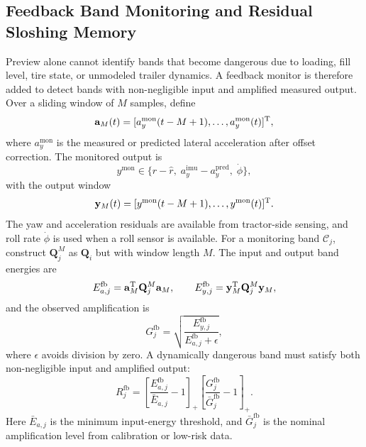 \subsection{Feedback Band Monitoring and Residual Sloshing Memory}
Preview alone cannot identify bands that become dangerous due to loading, fill level, tire state, or unmodeled trailer dynamics. A feedback monitor is therefore added to detect bands with non-negligible input and amplified measured output. Over a sliding window of $M$ samples, define
\begin{equation}
    \mathbf{a}_M(t)=[a_y^{\mathrm{mon}}(t-M+1),\ldots,a_y^{\mathrm{mon}}(t)]^{\mathrm{T}} ,
\end{equation}
where $a_y^{\mathrm{mon}}$ is the measured or predicted lateral acceleration after offset correction. The monitored output is
\begin{equation}
    y^{\mathrm{mon}}\in\{r-\hat r,\; a_y^{\mathrm{imu}}-a_y^{\mathrm{pred}},\; \dot\phi\},
\end{equation}
with the output window
\begin{equation}
    \mathbf{y}_M(t)=[y^{\mathrm{mon}}(t-M+1),\ldots,y^{\mathrm{mon}}(t)]^{\mathrm{T}} .
\end{equation}
The yaw and acceleration residuals are available from tractor-side sensing, and roll rate $\dot\phi$ is used when a roll sensor is available. For a monitoring band $\mathcal{C}_j$, construct $\mathbf{Q}_j^{M}$ as $\mathbf{Q}_i$ but with window length $M$. The input and output band energies are
\begin{equation}
    E_{a,j}^{\mathrm{fb}}=\mathbf{a}_M^{\mathrm{T}}\mathbf{Q}_j^{M}\mathbf{a}_M,\qquad
    E_{y,j}^{\mathrm{fb}}=\mathbf{y}_M^{\mathrm{T}}\mathbf{Q}_j^{M}\mathbf{y}_M ,
\end{equation}
and the observed amplification is
\begin{equation}
    G_j^{\mathrm{fb}}=\sqrt{\frac{E_{y,j}^{\mathrm{fb}}}{E_{a,j}^{\mathrm{fb}}+\epsilon}},
    \label{eq:feedback_gain}
\end{equation}
where $\epsilon$ avoids division by zero. A dynamically dangerous band must satisfy both non-negligible input and amplified output:
\begin{equation}
    R_j^{\mathrm{fb}}=
    \left[\frac{E_{a,j}^{\mathrm{fb}}}{\bar E_{a,j}}-1\right]_+
    \left[\frac{G_j^{\mathrm{fb}}}{\bar G_{j}^{\mathrm{fb}}}-1\right]_+ .
    \label{eq:feedback_risk}
\end{equation}
Here $\bar E_{a,j}$ is the minimum input-energy threshold, and $\bar G_j^{\mathrm{fb}}$ is the nominal amplification level from calibration or low-risk data.

